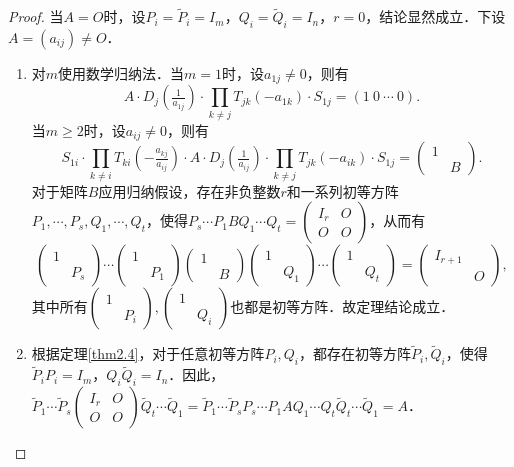 \documentclass[a4paper,fontset=windows]{ctexbook}
\theoremstyle{definition}
\renewcommand{\ge}{\geqslant}
\begin{document}
\begin{proof}
当$A=O$时，设$P_i=\widetilde{P}_i=I_m$，$Q_i=\widetilde{Q}_i=I_n$，$r=0$，结论显然成立．下设$A=(a_{ij})\ne O$．
\begin{enumerate}
\item 对$m$使用数学归纳法．当$m=1$时，设$a_{1j}\ne 0$，则有
$$A\cdot D_j(\tfrac{1}{a_{1j}})\cdot\prod\limits_{k\ne j}T_{jk}(-a_{1k})\cdot S_{1j}=(1~0~\cdots~0).$$
当$m\ge 2$时，设$a_{ij}\ne 0$，则有
$$S_{1i}\cdot\prod\limits_{k\ne i}T_{ki}(-\tfrac{a_{kj}}{a_{ij}})\cdot A\cdot D_j(\tfrac{1}{a_{ij}})\cdot\prod\limits_{k\ne j}T_{jk}(-a_{ik})\cdot S_{1j}=\begin{pmatrix}1& \\ &B\end{pmatrix}.$$
对于矩阵$B$应用归纳假设，存在非负整数$r$和一系列初等方阵$P_1,\cdots,P_s,Q_1,\cdots,Q_t$，使得$P_s\cdots P_1BQ_1\cdots Q_t=\begin{pmatrix}I_r&O \\ O&O\end{pmatrix}$，从而有
$$\begin{pmatrix}1& \\ &P_s\end{pmatrix}\cdots\begin{pmatrix}1& \\ &P_1\end{pmatrix}\begin{pmatrix}1& \\ &B\end{pmatrix}\begin{pmatrix}1& \\ &Q_1\end{pmatrix}\cdots\begin{pmatrix}1& \\ &Q_t\end{pmatrix}=\begin{pmatrix}I_{r+1}& \\ &O\end{pmatrix},$$
其中所有$\begin{pmatrix}1& \\ &P_i\end{pmatrix},\begin{pmatrix}1& \\ &Q_i\end{pmatrix}$也都是初等方阵．故定理结论成立．

\item 根据定理\ref{thm2.4}，对于任意初等方阵$P_i,Q_i$，都存在初等方阵$\widetilde{P}_i,\widetilde{Q}_i$，使得$\widetilde{P}_iP_i=I_m$，$Q_i\widetilde{Q}_i=I_n$．因此，$\widetilde{P}_1\cdots\widetilde{P}_s\begin{pmatrix}I_r&O \\ O&O\end{pmatrix}\widetilde{Q}_t\cdots\widetilde{Q}_1=\widetilde{P}_1\cdots\widetilde{P}_sP_s\cdots P_1AQ_1\cdots Q_t\widetilde{Q}_t\cdots\widetilde{Q}_1=A$．\qedhere
\end{enumerate}
\end{proof}
\end{document}
